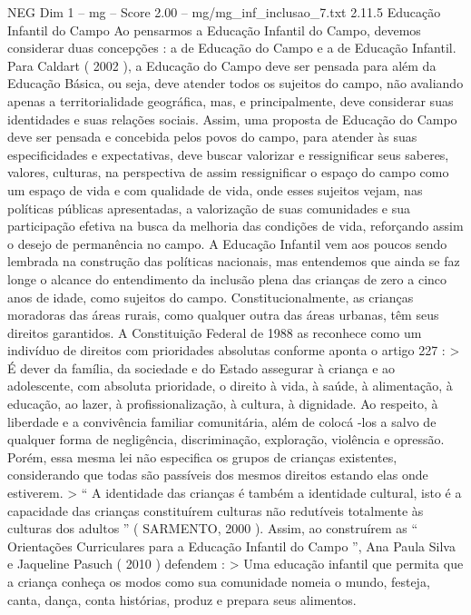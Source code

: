 \begin{textsample}{NEG Dim 1 – mg – Score 2.00 – mg/mg\_inf\_inclusao\_7.txt}  \label{ex:f1_neg_053}
2.11.5 Educação Infantil do Campo Ao pensarmos a Educação Infantil do Campo, devemos considerar duas concepções : a de Educação do Campo e a de Educação Infantil.
Para Caldart ( 2002 ), a Educação do Campo deve ser pensada para além da Educação Básica, ou seja, deve atender todos os sujeitos do campo, não avaliando apenas a territorialidade geográfica, mas, e principalmente, deve considerar suas identidades e suas relações sociais.
Assim, uma proposta de Educação do Campo deve ser pensada e concebida pelos povos do campo, para atender às suas especificidades e expectativas, deve buscar valorizar e ressignificar seus saberes, valores, culturas, na perspectiva de assim ressignificar o espaço do campo como um espaço de vida e com qualidade de vida, onde esses sujeitos vejam, nas políticas públicas apresentadas, a valorização de suas comunidades e sua participação efetiva na busca da melhoria das condições de vida, reforçando assim o desejo de permanência no campo.
A Educação Infantil vem aos poucos sendo lembrada na construção das políticas nacionais, mas entendemos que ainda se faz longe o alcance do entendimento da inclusão plena das crianças de zero a cinco anos de idade, como sujeitos do campo.
Constitucionalmente, as crianças moradoras das áreas rurais, como qualquer outra das áreas urbanas, têm seus direitos garantidos.
A Constituição Federal de 1988 as reconhece como um indivíduo de direitos com prioridades absolutas conforme aponta o artigo 227 : > É dever da família, da sociedade e do Estado assegurar à criança e ao adolescente, com absoluta prioridade, o direito à vida, à saúde, à alimentação, à educação, ao lazer, à profissionalização, à cultura, à dignidade.
Ao respeito, à liberdade e a convivência familiar comunitária, além de colocá -los a salvo de qualquer forma de negligência, discriminação, exploração, violência e opressão.
Porém, essa mesma lei não especifica os grupos de crianças existentes, considerando que todas são passíveis dos mesmos direitos estando elas onde estiverem. > “ A identidade das crianças é também a identidade cultural, isto é a capacidade das crianças constituírem culturas não redutíveis totalmente às culturas dos adultos ” ( SARMENTO, 2000 ).
Assim, ao construírem as “ Orientações Curriculares para a Educação Infantil do Campo ”, Ana Paula Silva e Jaqueline Pasuch ( 2010 ) defendem : > Uma educação infantil que permita que a criança conheça os modos como sua comunidade nomeia o mundo, festeja, canta, dança, conta histórias, produz e prepara seus alimentos.

\end{textsample}
